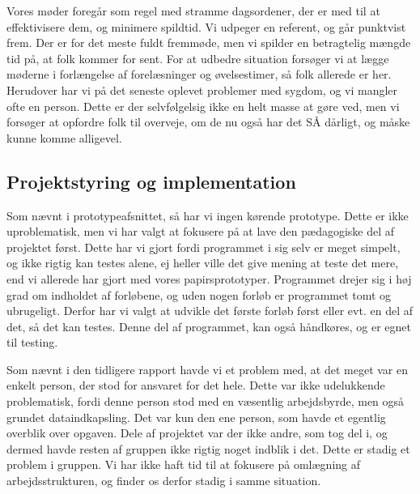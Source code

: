 \documentclass[10pt,a4paper,danish]{article}
\begin{document}
Vores møder foregår som regel med stramme dagsordener, der er med til at effektivisere dem, og minimere spildtid. Vi udpeger en referent, og går punktvist frem. Der er for det meste fuldt fremmøde, men vi spilder en betragtelig mængde tid på, at folk kommer for sent. For at udbedre situation forsøger vi at lægge møderne i forlængelse af forelæsninger og øvelsestimer, så folk allerede er her. Herudover har vi på det seneste oplevet problemer med sygdom, og vi mangler ofte en person. Dette er der selvfølgelsig ikke en helt masse at gøre ved, men vi forsøger at opfordre folk til overveje, om de nu også har det SÅ dårligt, og måske kunne komme alligevel.


\subsection{Projektstyring og implementation}
Som nævnt i prototypeafsnittet, så har vi ingen kørende prototype. Dette er ikke uproblematisk, men vi har valgt at fokusere på at lave den pædagogiske del af projektet først. Dette har vi gjort fordi programmet i sig selv er meget simpelt, og ikke rigtig kan testes alene, ej heller ville det give mening at teste det mere, end vi allerede har gjort med vores papirsprototyper. Programmet drejer sig i høj grad om indholdet af forløbene, og uden nogen forløb er programmet tomt og ubrugeligt. Derfor har vi valgt at udvikle det første forløb først eller evt. en del af det, så det kan testes. Denne del af programmet, kan også håndkøres, og er egnet til testing.

Som nævnt i den tidligere rapport havde vi et problem med, at det meget var en enkelt person, der stod for ansvaret for det hele. Dette var ikke udelukkende problematisk, fordi denne person stod med en væsentlig arbejdsbyrde, men også grundet dataindkapsling. Det var kun den ene person, som havde et egentlig overblik over opgaven. Dele af projektet var der ikke andre, som tog del i, og dermed havde resten af gruppen ikke rigtig noget indblik i det. Dette er stadig et problem i gruppen. Vi har ikke haft tid til at fokusere på omlægning af arbejdsstrukturen, og finder os derfor stadig i samme situation. 
\end{document}
